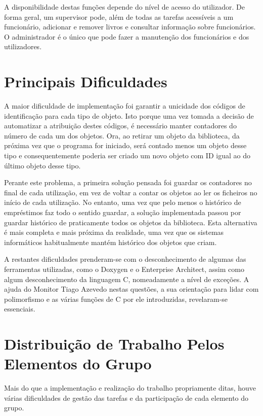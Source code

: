 \documentclass[12pt,a4paper,reqno]{report}
\numberwithin{figure}{section}
\numberwithin{equation}{section}
\def\Cpp{C\raisebox{0.5ex}{\tiny\textbf{++}}}
\begin{document}
A disponibilidade destas funções depende do nível de acesso do utilizador. De forma geral, um supervisor pode, além de todas as tarefas acessíveis a um funcionário, adicionar e remover livros e consultar informação sobre funcionários. O administrador é o único que pode fazer a manutenção dos funcionários e dos utilizadores.

\chapter{Principais Dificuldades}

A maior dificuldade de implementação foi garantir a unicidade dos códigos de identificação para cada tipo de objeto. Isto porque uma vez tomada a decisão de automatizar a atribuição destes códigos, é necessário manter contadores do número de cada um dos objetos. Ora, ao retirar um objeto da biblioteca, da próxima vez que o programa for iniciado, será contado menos um objeto desse tipo e consequentemente poderia ser criado um novo objeto com ID igual ao do último objeto desse tipo.

Perante este problema, a primeira solução pensada foi guardar os contadores no final de cada utilização, em vez de voltar a contar os objetos ao ler os ficheiros no início de cada utilização. No entanto, uma vez que pelo menos o histórico de empréstimos faz todo o sentido guardar, a solução implementada passou por guardar histórico de praticamente todos os objetos da biblioteca. Esta alternativa é mais completa e mais próxima da realidade, uma vez que os sistemas informáticos habitualmente mantém histórico dos objetos que criam.

A restantes dificuldades prenderam-se com o desconhecimento de algumas das ferramentas utilizadas, como o Doxygen e o Enterprise Architect, assim como algum desconhecimento da linguagem \Cpp{}, nomeadamente a nível de exceções. A ajuda do Monitor Tiago Azevedo nestas questões, a sua orientação para lidar com polimorfismo e as várias funções de \Cpp{} por ele introduzidas, revelaram-se essenciais.

\chapter{Distribuição de Trabalho Pelos Elementos do Grupo}

Mais do que a implementação e realização do trabalho propriamente ditas, houve várias dificuldades de gestão das tarefas e da participação de cada elemento do grupo.
\end{document}
